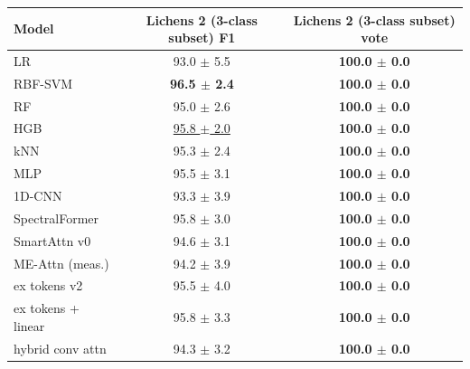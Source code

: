 \small
\begin{tabular}{lcc}
\toprule
Model & Lichens 2 (3-class subset) F1 & Lichens 2 (3-class subset) vote \\
\midrule
LR & 93.0 $\pm$ 5.5 & \textbf{100.0 $\pm$ 0.0} \\
RBF-SVM & \textbf{96.5 $\pm$ 2.4} & \textbf{100.0 $\pm$ 0.0} \\
RF & 95.0 $\pm$ 2.6 & \textbf{100.0 $\pm$ 0.0} \\
HGB & \underline{95.8 $\pm$ 2.0} & \textbf{100.0 $\pm$ 0.0} \\
kNN & 95.3 $\pm$ 2.4 & \textbf{100.0 $\pm$ 0.0} \\
MLP & 95.5 $\pm$ 3.1 & \textbf{100.0 $\pm$ 0.0} \\
1D-CNN & 93.3 $\pm$ 3.9 & \textbf{100.0 $\pm$ 0.0} \\
SpectralFormer & 95.8 $\pm$ 3.0 & \textbf{100.0 $\pm$ 0.0} \\
\midrule
SmartAttn v0 & 94.6 $\pm$ 3.1 & \textbf{100.0 $\pm$ 0.0} \\
ME-Attn (meas.) & 94.2 $\pm$ 3.9 & \textbf{100.0 $\pm$ 0.0} \\
ex tokens v2 & 95.5 $\pm$ 4.0 & \textbf{100.0 $\pm$ 0.0} \\
ex tokens + linear & 95.8 $\pm$ 3.3 & \textbf{100.0 $\pm$ 0.0} \\
hybrid conv attn & 94.3 $\pm$ 3.2 & \textbf{100.0 $\pm$ 0.0} \\
\bottomrule
\end{tabular}

